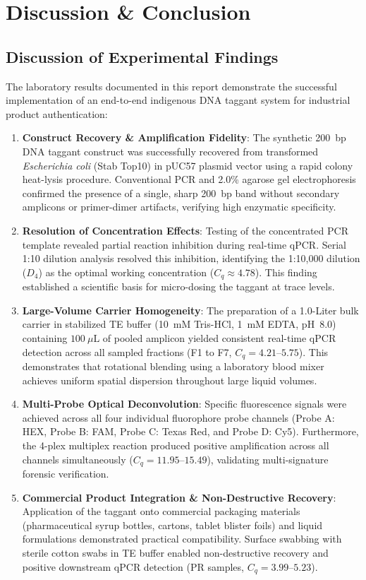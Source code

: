 \chapter{Discussion \& Conclusion}
\label{chap:discussion_conclusion}

\section{Discussion of Experimental Findings}
The laboratory results documented in this report demonstrate the successful implementation of an end-to-end indigenous DNA taggant system for industrial product authentication:

\begin{enumerate}
    \item \textbf{Construct Recovery \& Amplification Fidelity}: The synthetic 200~bp DNA taggant construct was successfully recovered from transformed \textit{Escherichia coli} (Stab Top10) in pUC57 plasmid vector using a rapid colony heat-lysis procedure. Conventional PCR and 2.0\% agarose gel electrophoresis confirmed the presence of a single, sharp 200~bp band without secondary amplicons or primer-dimer artifacts, verifying high enzymatic specificity.
    
    \item \textbf{Resolution of Concentration Effects}: Testing of the concentrated PCR template revealed partial reaction inhibition during real-time qPCR. Serial 1:10 dilution analysis resolved this inhibition, identifying the 1:10,000 dilution ($D_4$) as the optimal working concentration ($C_q \approx 4.78$). This finding established a scientific basis for micro-dosing the taggant at trace levels.
    
    \item \textbf{Large-Volume Carrier Homogeneity}: The preparation of a 1.0-Liter bulk carrier in stabilized TE buffer (10~mM Tris-HCl, 1~mM EDTA, pH~8.0) containing $100~\mu\text{L}$ of pooled amplicon yielded consistent real-time qPCR detection across all sampled fractions (F1 to F7, $C_q = 4.21\text{--}5.75$). This demonstrates that rotational blending using a laboratory blood mixer achieves uniform spatial dispersion throughout large liquid volumes.
    
    \item \textbf{Multi-Probe Optical Deconvolution}: Specific fluorescence signals were achieved across all four individual fluorophore probe channels (Probe A: HEX, Probe B: FAM, Probe C: Texas Red, and Probe D: Cy5). Furthermore, the 4-plex multiplex reaction produced positive amplification across all channels simultaneously ($C_q = 11.95\text{--}15.49$), validating multi-signature forensic verification.
    
    \item \textbf{Commercial Product Integration \& Non-Destructive Recovery}: Application of the taggant onto commercial packaging materials (pharmaceutical syrup bottles, cartons, tablet blister foils) and liquid formulations demonstrated practical compatibility. Surface swabbing with sterile cotton swabs in TE buffer enabled non-destructive recovery and positive downstream qPCR detection (PR samples, $C_q = 3.99\text{--}5.23$).
\end{enumerate}

